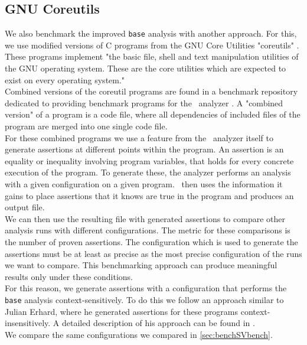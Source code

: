     \subsection{GNU Coreutils}\label{sec:benchCoreutils}
      We also benchmark the improved \texttt{base} analysis with another approach. For this, we use modified versions of C programs from the GNU Core Utilities "coreutils" \parencite{gnuCoreutils}. These programs implement "the basic file, shell and text manipulation utilities of the GNU operating system. These are the core utilities which are expected to exist on every operating system."\parencite{gnuCoreutils}\\
      Combined versions of the coreutil programs are found in a benchmark repository dedicated to providing benchmark programs for the \gob\ analyzer \parencite{goblintBench}. A "combined version" of a program is a code file, where all dependencies of included files of the program are merged into one single code file.\\
      For these combined programs we use a feature from the \gob\ analyzer itself to generate assertions at different points within the program. An assertion is an equality or inequality involving program variables, that holds for every concrete execution of the program. To generate these, the analyzer performs an analysis with a given configuration on a given program. \gob\ then uses the information it gains to place assertions that it knows are true in the program and produces an output file.\\
      We can then use the resulting file with generated assertions to compare other analysis runs with different configurations. The metric for these comparisons is the number of proven assertions. The configuration which is used to generate the assertions must be at least as precise as the most precise configuration of the runs we want to compare. This benchmarking approach can produce meaningful results only under these conditions.\\
      For this reason, we generate assertions with a configuration that performs the \texttt{base} analysis context-sensitively. To do this we follow an approach similar to Julian Erhard, where he generated assertions for these programs context-insensitively. A detailed description of his approach can be found in \parencite{svBenchCoreutils}.\\
      We compare the same configurations we compared in \autoref{sec:benchSVbench}.\\
      
